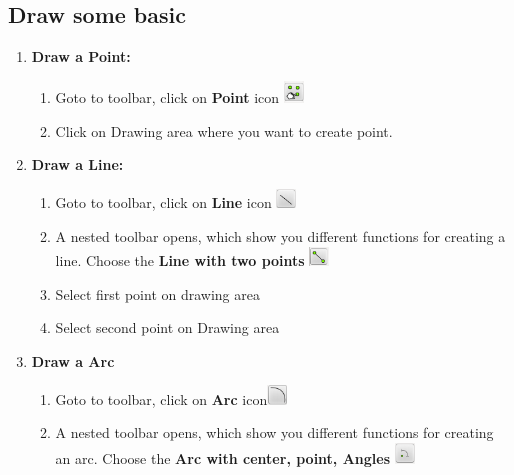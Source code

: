 \vspace{.3in}  %
\subsection*{Draw some basic}
\begin{enumerate}
\vspace{.25in}
\item{\textbf{Draw a Point:}
      \begin{enumerate}
      \item{Goto to toolbar, click on \textbf{Point} icon \includegraphics[width=20px]{./images/point.png}}
      \item{Click on Drawing area where you want to create point.}
      \end{enumerate}}
%
\vspace{.25in}
\item{\textbf{Draw a Line:}
      \begin{enumerate}
      \item{Goto to toolbar, click on \textbf{Line} icon \includegraphics[width=20px]{./images/line.png}}
      \item{A nested toolbar opens, which show you different functions for creating a line. Choose the \textbf{Line with two points }\includegraphics[width=20px]{./images/line2p.png}}
      \item{Select first point on drawing area}
      \item{Select second point on Drawing area}  
      \end{enumerate}}
%
\vspace{.25in}
\item{\textbf{Draw a Arc}
    \begin{enumerate}
    \item{Goto to toolbar, click on \textbf{Arc} icon\includegraphics[width=20px]{./images/arc.png}}
    \item{A nested toolbar opens, which show you different functions for creating an arc. Choose the \textbf{Arc with center, point, Angles }\includegraphics[width=20px]{./images/arc_cpa.png}}

\end{enumerate}}
\end{enumerate}
